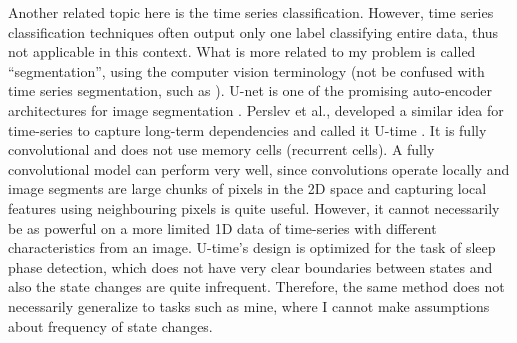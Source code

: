Another related topic here is the time series classification. However, time series classification techniques often output only one label classifying entire data, thus not applicable in this context. 
What is more related to my problem is called ``segmentation'', using the computer vision terminology (not be confused with time series segmentation, such as \cite{lemire2007better}). 
U-net is one of the promising auto-encoder architectures for image segmentation \cite{ronneberger2015u}. Perslev et al., developed a similar idea for time-series to capture long-term dependencies and called it U-time \cite{perslev2019u}. It is fully convolutional and does not use memory cells (recurrent cells). 
A fully convolutional model can perform very well, since convolutions operate locally and image segments are large chunks of pixels in the 2D space and capturing local features using neighbouring pixels is quite useful. However, it cannot necessarily be as powerful on a more limited 1D data of time-series with different characteristics from an image. 
U-time's design is optimized for the task of sleep phase detection, which does not have very clear boundaries between states and also the state changes are quite infrequent. Therefore, the same method does not necessarily generalize to tasks such as mine, where I cannot make assumptions about frequency of state changes.


